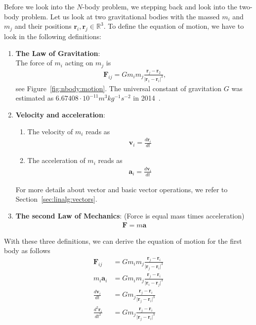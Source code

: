 \documentclass[11pt,fleqn]{book} %
\begin{document}
Before we look into the $N$-body problem, we stepping back and look into the two-body problem. Let us look at two gravitational bodies with the massed $m_i$ and $m_j$ and their positions $\mathbf{r}_i,\mathbf{r}_j\in\mathbb{R}^3$. To define the equation of motion, we have to look in the following definitions:
\vspace{0.25cm}
\begin{enumerate}
\item \textbf{The Law of Gravitation}: \\
The force of $m_i$ acting on $m_j$ is 
\begin{align}
\mathbf{F}_{ij}= G m_i m_j \frac{\mathbf{r}_j-\mathbf{r}_2}{\vert \mathbf{r}_1-\mathbf{r}_i \vert^3}\text{,}
\end{align}
see Figure~\ref{fig:nbody:motion}. The universal constant of gravitation $G$ was estimated as $6.67408\cdot 10^{-11}m^3kg^{-1}s^{-2}$ in 2014~\cite{mohr2016codata}.
\item \textbf{Velocity and acceleration}: 
\begin{enumerate}
\item The velocity of $m_i$ reads as
\begin{align}
\mathbf{v}_i = \frac{d \mathbf{r}_i}{dt} \label{eq:nbody:vel}
\end{align}
\item The acceleration of $m_i$ reads as
\begin{align}
\mathbf{a}_i = \frac{d \mathbf{v}_i}{dt} \label{eq:nbody:acc}
\end{align}
\end{enumerate}
For more details about vector and basic vector operations, we refer to Section~\ref{sec:linalg:vectors}.
\item \textbf{The second Law of Mechanics}:  (Force is equal mass times acceleration) 
\begin{align}
\mathbf{F}= m \mathbf{a} \label{eq:law:first}
\end{align}
\end{enumerate}
With these three definitions, we can derive the equation of motion for the first body as follows
\begin{align}
\mathbf{F}_{ij}&=G m_i m_j \frac{\mathbf{r}_j-\mathbf{r}_i}{\vert \mathbf{r}_j-\mathbf{r}_i \vert^3} \label{eq:nbody:motion1} \\
m_i \mathbf{a}_i &= G m_i m_j \frac{\mathbf{r}_j-\mathbf{r}_i}{\vert \mathbf{r}_i-\mathbf{r}_j \vert^3} \label{eq:nbody:motion2} \\
\frac{d \mathbf{v}_i}{dt} & = G m_j \frac{\mathbf{r}_j-\mathbf{r}_i}{\vert \mathbf{r}_j-\mathbf{r}_i \vert^3} \label{eq:nbody:motion3} \\
\frac{d^2 \mathbf{r}_i}{dt^2} & = G m_j \frac{\mathbf{r}_j-\mathbf{r}_i}{\vert \mathbf{r}_j-\mathbf{r}_i \vert^3}
\label{eq:nbody:motion4}
\end{align}
\end{document}
